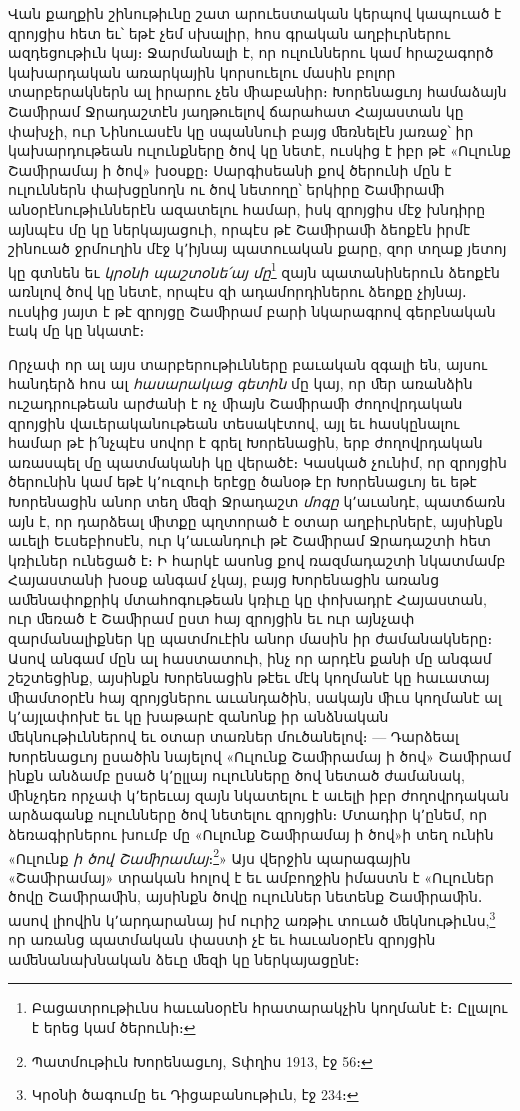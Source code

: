 \documentclass{article}
\begin{document}
{Վան քաղքին շինութիւնը շատ արուեստական կերպով կապուած է զրոյցիս հետ եւ՝ եթէ չեմ սխալիր, հոս գրական աղբիւրներու ազդեցութիւն կայ։ Ջարմանալի է, որ ուլուններու կամ հրաշագործ կախարդական առարկային կորսուելու մասին բոլոր տարբերակներն ալ իրարու չեն ﬕաբանիր։ Խորենացւոյ համաձայն Շաﬕրամ Ջրադաշտէն յաղթուելով ճարահատ Հայաստան կը փախչի, ուր Նինուասէն կը սպաննուի բայց ﬔռնելէն յառաջ՝ իր կախարդութեան ուլունքները ծով կը նետէ, ուսկից է իբր թէ «Ուլունք Շաﬕրամայ ի ծով» խօսքը։ Սարգիսեանի քով ծերունի մըն է ուլուններն փախցընողն ու ծով նետողը՝ երկիրը Շաﬕրաﬕ անօրէնութիւններէն ազատելու համար, իսկ զրոյցիս մէջ խնդիրը այնպէս մը կը ներկայացուի, որպէս թէ Շաﬕրաﬕ ձեոքէն իրմէ շինուած ջրմուղին մէջ կ՚իյնայ պատուական քարը, զոր տղաք յետոյ կը գտնեն եւ \emph{կրօնի պաշտօնե՛այ մը}\footnote{Բացատրութիւնս հաւանօրէն հրատարակչին կողմանէ է։ Ըլլալու է երեց կամ ծերունի։} զայն պատանիներուն ձեոքէն առնլով ծով կը նետէ, որպէս զի ադամորդիներու ձեոքը չիյնայ․ ուսկից յայտ է թէ զրոյցը Շաﬕրամ բարի նկարագրով գերբնական էակ մը կը նկատէ։

Որչափ որ ալ այս տարբերութիւնները բաւական զգալի են, այսու հանդերձ հոս ալ \emph{հասարակաց գետին} մը կայ, որ ﬔր առանձին ուշադրութեան արժանի է ոչ ﬕայն Շաﬕրաﬕ ժողովրդական զրոյցին վաւերականութեան տեսակէտով, այլ եւ հասկընալու համար թէ ի՛նչպէս սովոր է գրել Խորենացին, երբ ժողովրդական առասպել մը պատմականի կը վերածէ։ Կասկած չունիմ, որ զրոյցին ծերունին կամ եթէ կ՚ուզուի երէցը ծանօթ էր Խորենացւոյ եւ եթէ Խորենացին անոր տեղ ﬔզի Ջրադաշտ \emph{մոգը} կ՚աւանդէ, պատճառն այն է, որ դարձեալ ﬕտքը պղտորած է օտար աղբիւրներէ, այսինքն աւելի Եւսեբիոսէն, ուր կ՚աւանդուի թէ Շաﬕրամ Ջրադաշտի հետ կռիւներ ունեցած է։ Ի հարկէ ասոնց քով ռազմադաշտի նկատմամբ Հայաստանի խօսք անգամ չկայ, բայց Խորենացին առանց աﬔնափոքրիկ մտահոգութեան կռիւը կը փոխադրէ Հայաստան, ուր ﬔռած է Շաﬕրամ ըստ հայ զրոյցին եւ ուր այնչափ զարմանալիքներ կը պատմուէին անոր մասին իր ժամանակները։ Ասով անգամ մըն ալ հաստատուի, ինչ որ արդէն քանի մը անգամ շեշտեցինք, այսինքն Խորենացին թէեւ մէկ կողմանէ կը հաւատայ ﬕամտօրէն հայ զրոյցներու աւանդածին, սակայն ﬕւս կողմանէ ալ կ՚այլափոխէ եւ կը խաթարէ զանոնք իր անձնական ﬔկնութիւններով եւ օտար տառներ մուծանելով։ — Դարձեալ Խորենացւոյ ըսածին նայելով «Ուլունք Շաﬕրամայ ի ծով» Շաﬕրամ ինքն անձամբ ըսած կ՚ըլլայ ուլունները ծով նետած ժամանակ, ﬕնչդեռ որչափ կ՚երեւայ զայն նկատելու է աւելի իբր ժողովրդական արձագանք ուլունները ծով նետելու զրոյցին։ Մտադիր կ՚ընեմ, որ ձեռագիրներու խումբ մը «Ուլունք Շաﬕրամայ ի ծով»ի տեղ ունին «Ուլունք \emph{ի ծով Շաﬕրամայ}։\footnote{Պատմութիւն Խորենացւոյ, Տփղիս 1913, էջ 56։}» Այս վերջին պարագային «Շաﬕրամայ» տրական հոլով է եւ ամբողջին իմաստն է «Ուլուներ ծովը Շաﬕրաﬕն, այսինքն ծովը ուլուններ նետենք Շաﬕրաﬕն․ ասով լիովին կ՚արդարանայ իմ ուրիշ առթիւ տուած ﬔկնութիւնս,\footnote{Կրօնի ծագումը եւ Դիցաբանութիւն, էջ 234։} որ առանց պատմական փաստի չէ եւ հաւանօրէն զրոյցին աﬔնանախնական ձեւը ﬔզի կը ներկայացընէ։

}
\end{document}
